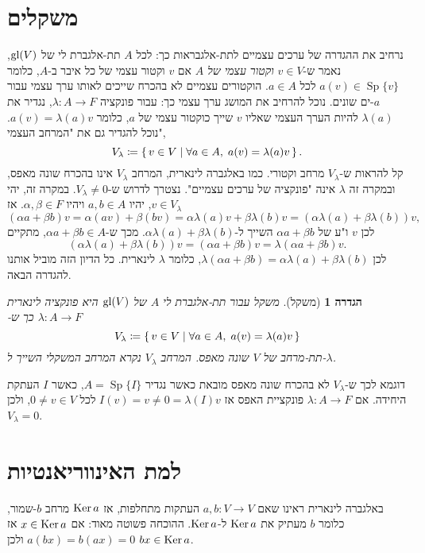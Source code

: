 \documentclass{report}
\theoremstyle{break}
\newtheorem{definition}[definition]{הגדרה}
\theoremstyle{MyNonumberbreak}
\DeclareMathOperator{\Sp}{Sp}
\begin{document}
\section{משקלים}
נרחיב את ההגדרה של ערכים עצמיים לתת-אלגבראות כך: לכל $A$ תת-אלגברת לי של $\operatorname{gl}(V)$, נאמר ש-$v \in V$ \textit{וקטור עצמי של $A$} אם $v$ וקטור עצמי של כל איבר ב-$A$, כלומר $a(v) \in \Sp\{v\}$ לכל $a \in A$. הוקטורים עצמיים לא בהכרח שייכים לאותו ערך עצמי עבור $a$-ים שונים. נוכל להרחיב את המושג ערך עצמי כך: עבור פונקציה $\lambda : A \to F$, נגדיר את $\lambda(a)$ להיות הערך העצמי שאליו $v$ שייך כוקטור עצמי של $a$, כלומר $a(v) = \lambda(a)v$. נוכל להגדיר גם את "המרחב העצמי",
\[ V_\lambda \coloneqq \set{v \in V | \forall a \in A, \; a(v) = \lambda(a)v}. \]
קל להראות ש-$V_\lambda$ מרחב וקטורי. כמו באלגברה לינארית, המרחב $V_\lambda$ אינו בהכרח שונה מאפס, ובמקרה זה $\lambda$ אינה "פונקציה של ערכים עצמיים". נצטרך לדרוש ש-$V_\lambda \neq 0$. במקרה זה, יהי $v \in V_\lambda$, יהיו $a, b \in A$ ויהיו $\alpha, \beta \in F$. אז
\[ (\alpha a + \beta b)v = \alpha(av) + \beta(bv) = \alpha\lambda(a)v + \beta\lambda(b)v = (\alpha\lambda(a) + \beta\lambda(b))v, \]
לכן $v$ ו"ע של $\alpha a + \beta b$ השייך ל-$\alpha\lambda(a) + \beta\lambda(b)$. מכך ש-$\alpha a + \beta b \in A$, מתקיים
\[ (\alpha\lambda(a) + \beta\lambda(b))v = (\alpha a + \beta b)v = \lambda(\alpha a + \beta b)v. \]
לכן $\lambda(\alpha a + \beta b) = \alpha\lambda(a) + \beta\lambda(b)$, כלומר $\lambda$ לינארית. כל הדיון הזה מוביל אותנו להגדרה הבאה.
\begin{definition}[משקל]
	\textit{משקל} עבור תת-אלגברת לי $A$ של $\operatorname{gl}(V)$ היא פונקציה לינארית $\lambda : A \to F$ כך ש-
	\[ V_\lambda \coloneqq \set{v \in V | \forall a \in A, \; a(v) = \lambda(a)v} \]
	תת-מרחב של $V$ שונה מאפס. המרחב $V_\lambda$ נקרא \textit{המרחב המשקלי} השייך ל-$\lambda$.
\end{definition}
דוגמא לכך ש-$V_\lambda$ לא בהכרח שונה מאפס מובאת כאשר נגדיר $A = \Sp\{I\}$, כאשר $I$ העתקת היחידה. אם $\lambda : A \to F$  פונקציית האפס אז $I(v) = v \neq 0 = \lambda(I)v$ לכל $0 \neq v \in V$, ולכן $V_\lambda = 0$.

\section{למת האינווריאנטיות}
באלגברה לינארית ראינו שאם $a, b : V \to V$ העתקות מתחלפות, אז $\operatorname{Ker} a$ מרחב $b$-שמור, כלומר $b$ מעתיק את $\operatorname{Ker} a$ ל-$\operatorname{Ker} a$. ההוכחה פשוטה מאוד: אם $x \in \operatorname{Ker} a$ אז $a(bx) = b(ax) = 0$ ולכן $bx \in \operatorname{Ker} a$.
\end{document}
